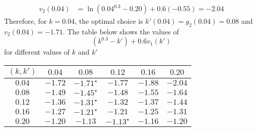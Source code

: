 \documentclass[10pt]{article}
\begin{document}
\begin{example}
\begin{enumerate}
\begin{example}
\begin{align*}
				v_2(0.04) &= \ln(0.04^{0.3} - 0.20) + 0.6 (-0.55) = -2.04
			\end{align*}
			Therefore, for $k = 0.04$, the optimal choice is $k'(0.04) = g_2(0.04) = 0.08$ and $v_2(0.04) = -1.71$. The table below shows the values of
			\[
			(k^{0.3} - k')+ 0.6 v_1(k')
			\]
			for different values of $k$ and $k'$
			\begin{center}
				\begin{tabular}{ c | c c c c c}
				$(k,k')$ & $0.04$ & $0.08$ & $0.12$ & $0.16$ & $0.20$ \\
				\hline 
				$0.04$ & $-1.72$ & $-1.71^\star$ & $-1.77$ & $-1.88$ & $-2.04$ \\
				$0.08$ & $-1.49$ & $-1.45^\star$ & $-1.48$ & $-1.55$ & $-1.64$ \\
				$0.12$ & $-1.36$ & $-1.31^\star$ & $-1.32$ & $-1.37$ & $-1.44$ \\
				$0.16$ & $-1.27$ & $-1.21^\star$ & $-1.21$ & $-1.25$ & $-1.31$ \\
				$0.20$ & $-1.20$ & $-1.13$ & $-1.13^\star$ & $-1.16$ & $-1.20$
				\end{tabular}
			\end{center}
		\end{example}
		

\end{enumerate}
\end{example}
\end{document}
